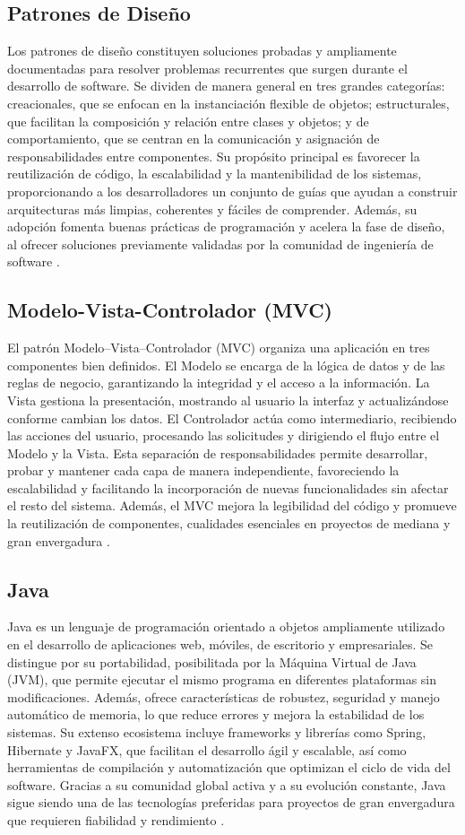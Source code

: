 \subsection{Patrones de Diseño}
Los patrones de diseño constituyen soluciones probadas y ampliamente documentadas para resolver problemas recurrentes que surgen durante el desarrollo de software. Se dividen de manera general en tres grandes categorías: creacionales, que se enfocan en la instanciación flexible de objetos; estructurales, que facilitan la composición y relación entre clases y objetos; y de comportamiento, que se centran en la comunicación y asignación de responsabilidades entre componentes. Su propósito principal es favorecer la reutilización de código, la escalabilidad y la mantenibilidad de los sistemas, proporcionando a los desarrolladores un conjunto de guías que ayudan a construir arquitecturas más limpias, coherentes y fáciles de comprender. Además, su adopción fomenta buenas prácticas de programación y acelera la fase de diseño, al ofrecer soluciones previamente validadas por la comunidad de ingeniería de software \cite{ref3}.

\subsection{Modelo-Vista-Controlador (MVC)}
El patrón Modelo–Vista–Controlador (MVC) organiza una aplicación en tres componentes bien definidos. El Modelo se encarga de la lógica de datos y de las reglas de negocio, garantizando la integridad y el acceso a la información. La Vista gestiona la presentación, mostrando al usuario la interfaz y actualizándose conforme cambian los datos. El Controlador actúa como intermediario, recibiendo las acciones del usuario, procesando las solicitudes y dirigiendo el flujo entre el Modelo y la Vista. Esta separación de responsabilidades permite desarrollar, probar y mantener cada capa de manera independiente, favoreciendo la escalabilidad y facilitando la incorporación de nuevas funcionalidades sin afectar el resto del sistema. Además, el MVC mejora la legibilidad del código y promueve la reutilización de componentes, cualidades esenciales en proyectos de mediana y gran envergadura \cite{ref4}.

\subsection{Java}
Java es un lenguaje de programación orientado a objetos ampliamente utilizado en el desarrollo de aplicaciones web, móviles, de escritorio y empresariales. Se distingue por su portabilidad, posibilitada por la Máquina Virtual de Java (JVM), que permite ejecutar el mismo programa en diferentes plataformas sin modificaciones. Además, ofrece características de robustez, seguridad y manejo automático de memoria, lo que reduce errores y mejora la estabilidad de los sistemas. Su extenso ecosistema incluye frameworks y librerías como Spring, Hibernate y JavaFX, que facilitan el desarrollo ágil y escalable, así como herramientas de compilación y automatización que optimizan el ciclo de vida del software. Gracias a su comunidad global activa y a su evolución constante, Java sigue siendo una de las tecnologías preferidas para proyectos de gran envergadura que requieren fiabilidad y rendimiento \cite{ref5}.